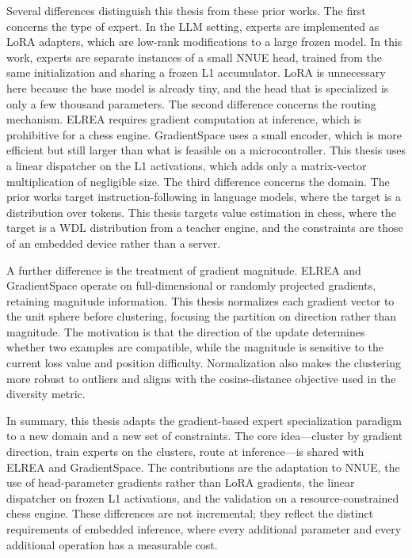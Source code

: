 Several differences distinguish this thesis from these prior works. The first concerns the type of expert. In the LLM setting, experts are implemented as LoRA adapters, which are low-rank modifications to a large frozen model. In this work, experts are separate instances of a small NNUE head, trained from the same initialization and sharing a frozen L1 accumulator. LoRA is unnecessary here because the base model is already tiny, and the head that is specialized is only a few thousand parameters. The second difference concerns the routing mechanism. ELREA requires gradient computation at inference, which is prohibitive for a chess engine. GradientSpace uses a small encoder, which is more efficient but still larger than what is feasible on a microcontroller. This thesis uses a linear dispatcher on the L1 activations, which adds only a matrix-vector multiplication of negligible size. The third difference concerns the domain. The prior works target instruction-following in language models, where the target is a distribution over tokens. This thesis targets value estimation in chess, where the target is a WDL distribution from a teacher engine, and the constraints are those of an embedded device rather than a server.


A further difference is the treatment of gradient magnitude. ELREA and GradientSpace operate on full-dimensional or randomly projected gradients, retaining magnitude information. This thesis normalizes each gradient vector to the unit sphere before clustering, focusing the partition on direction rather than magnitude. The motivation is that the direction of the update determines whether two examples are compatible, while the magnitude is sensitive to the current loss value and position difficulty. Normalization also makes the clustering more robust to outliers and aligns with the cosine-distance objective used in the diversity metric.

In summary, this thesis adapts the gradient-based expert specialization paradigm to a new domain and a new set of constraints. The core idea---cluster by gradient direction, train experts on the clusters, route at inference---is shared with ELREA and GradientSpace. The contributions are the adaptation to NNUE, the use of head-parameter gradients rather than LoRA gradients, the linear dispatcher on frozen L1 activations, and the validation on a resource-constrained chess engine. These differences are not incremental; they reflect the distinct requirements of embedded inference, where every additional parameter and every additional operation has a measurable cost.





